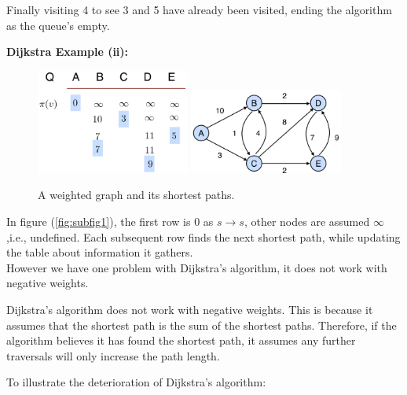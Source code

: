 \noindent
Finally visiting 4 to see 3 and 5 have already been visited, ending the algorithm as the queue's empty.


\newpage

\textbf{Dijkstra Example (ii):}\\

\begin{figure}[h!]
    \centering
    \includegraphics[width=0.45\textwidth]{./Sections/dstra/w_dist.png} %
    \hfill %
    \includegraphics[width=0.45\textwidth]{./Sections/dstra/w_graph.png} %
    \caption{A weighted graph and its shortest paths.}
    \label{fig:combined_figure}
\end{figure}


\noindent
In figure (\ref{fig:subfig1}), the first row is $0$ as $s\to s$, other nodes are assumed $\infty$,i.e., undefined. Each subsequent row finds the next shortest path, while 
updating the table about information it gathers.\\
\noindent
However we have one problem with Dijkstra's algorithm, it does not work with negative weights.
\begin{theo}
    
    Dijkstra's algorithm does not work with negative weights. This is because it assumes that the shortest path is the sum of the shortest paths. Therefore,
    if the algorithm believes it has found the shortest path, it assumes any further traversals will only increase the path length.
\end{theo}


\noindent
To illustrate the deterioration of Dijkstra's algorithm:

